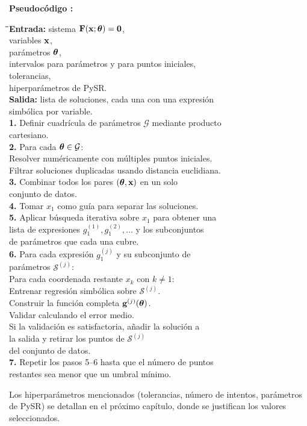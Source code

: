 \medskip {}\label{alg:proceso_principal} \noindent\textbf{Pseudocódigo \thepseudocode:} \begin{tabbing} \qquad \= \qquad \= \qquad \= \kill \textbf{Entrada:} \>\>\> sistema \(\mathbf{F}(\mathbf{x}; \boldsymbol{\theta}) = \mathbf{0}\), \\
\>\>\> variables \(\mathbf{x}\), \\
\>\>\> parámetros \(\boldsymbol{\theta}\), \\
\>\>\> intervalos para parámetros y para puntos iniciales, \\
\>\>\> tolerancias, \\
\>\>\> hiperparámetros de PySR. \\
\textbf{Salida:} \>\>\> lista de soluciones, cada una con una expresión \\
\>\>\> simbólica por variable. \\[4pt]
\textbf{1.} \> Definir cuadrícula de parámetros \(\mathcal{G}\) mediante producto \\
\> cartesiano. \\
\textbf{2.} \> Para cada \(\boldsymbol{\theta} \in \mathcal{G}\): \\
\> \qquad Resolver numéricamente con múltiples puntos iniciales. \\
\> \qquad Filtrar soluciones duplicadas usando distancia euclidiana. \\
\textbf{3.} \> Combinar todos los pares \((\boldsymbol{\theta}, \mathbf{x})\) en un solo \\
\> conjunto de datos. \\
\textbf{4.} \> Tomar \(x_1\) como guía para separar las soluciones. \\
\textbf{5.} \> Aplicar búsqueda iterativa sobre \(x_1\) para obtener una \\
\> lista de expresiones \(g_1^{(1)}, g_1^{(2)}, \dots\) y los subconjuntos \\
\> de parámetros que cada una cubre. \\
\textbf{6.} \> Para cada expresión \(g_1^{(j)}\) y su subconjunto de \\
\> parámetros \(\mathcal{S}^{(j)}\): \\
\> \qquad Para cada coordenada restante \(x_k\) con \(k \neq 1\): \\
\> \qquad \qquad Entrenar regresión simbólica sobre \(\mathcal{S}^{(j)}\). \\
\> \qquad Construir la función completa \(\mathbf{g}^{(j)}(\boldsymbol{\theta})\). \\
\> \qquad Validar calculando el error medio. \\
\> \qquad Si la validación es satisfactoria, añadir la solución a \\
\> \qquad la salida y retirar los puntos de \(\mathcal{S}^{(j)}\) \\
\> \qquad del conjunto de datos. \\
\textbf{7.} \> Repetir los pasos 5--6 hasta que el número de puntos \\
\> restantes sea menor que un umbral mínimo. \end{tabbing} \medskip

Los hiperparámetros mencionados (tolerancias, número de intentos, parámetros de PySR) se detallan en el próximo capítulo, donde se justifican los valores seleccionados. 